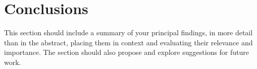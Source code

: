 \chapter{Conclusions} \label{chapter:Conclusions}
This section should include a summary of your principal findings, in more detail than in the abstract, placing them in context and evaluating their relevance and importance. The section should also propose and explore suggestions for future work.
